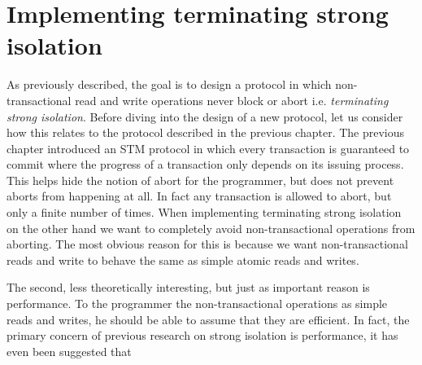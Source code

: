 
\section{Implementing terminating strong isolation}
\label{sec:badthings}

As previously described, the goal is to design a protocol in which
non-transactional read and write operations never block or abort
i.e. {\it terminating strong isolation}.
Before diving into the design of a new protocol, let us consider how
this relates to the protocol described in the previous chapter.
The previous chapter introduced an STM protocol in which every transaction
is guaranteed to commit where the progress of a transaction only depends on
its issuing process.
This helps hide the notion of abort for the programmer, but does
not prevent aborts from happening at all.
In fact any transaction is allowed to abort, but only a finite number
of times.
When implementing terminating strong isolation on the other hand we
want to completely avoid non-transactional operations from aborting.
The most obvious reason for this is because we want non-transactional reads and write
to behave the same as simple atomic reads and writes.

The second, less theoretically interesting, but just as important reason
is performance.
To the programmer the non-transactional operations as simple reads and
writes, he should be able to assume that they are efficient.
In fact, the primary concern of previous research on strong isolation
is performance, it has even been suggested that 


